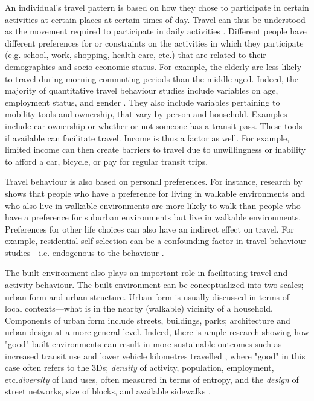An individual's travel pattern is based on how they chose to participate in certain activities at certain places at certain times of day. Travel can thus be understood as the movement required to participate in daily activities \cite{hanson_determinants_1982}. Different people have different preferences for or constraints on the activities in which they participate (e.g. school, work, shopping, health care, etc.) that are related to their demographics and socio-economic status. For example, the elderly are less likely to travel during morning commuting periods than the middle aged. Indeed, the majority of quantitative travel behaviour studies include variables on age, employment status, and gender \cite{hanson_determinants_1982}. They also include variables pertaining to mobility tools and ownership, that vary by person and household. Examples include car ownership or whether or not someone has a transit pass. These tools if available can facilitate travel. Income is thus a factor as well. For example, limited income can then create barriers to travel due to unwillingness or inability to afford a car, bicycle, or pay for regular transit trips.

Travel behaviour is also based on personal preferences. For instance, research by  shows that people who have a preference for living in walkable environments and who also live in walkable environments are more likely to walk than people who have a preference for suburban environments but live in walkable environments. Preferences for other life choices can also have an indirect effect on travel. For example, residential self-selection can be a confounding factor in travel behaviour studies - i.e. endogenous to the behaviour \cite{cao_how_2016}.

The built environment also plays an important role in facilitating travel and activity behaviour. The built environment can be conceptualized into two scales; urban form and urban structure. Urban form is usually discussed in terms of local contexts---what is in the nearby (walkable) vicinity of a household. Components of urban form include streets, buildings, parks; architecture and urban design at a more general level. Indeed, there is ample research showing how "good" built environments can result in more sustainable outcomes such as increased transit use and lower vehicle kilometres travelled \cite{ewing_travel_2010,ewing_compactness_2015}, where "good" in this case often refers to the 3Ds; \textit{density} of activity, population, employment, etc.\textit{diversity} of land uses, often measured in terms of entropy, and the \textit{design} of street networks, size of blocks, and available sidewalks \cite{cervero_travel_1997}.

